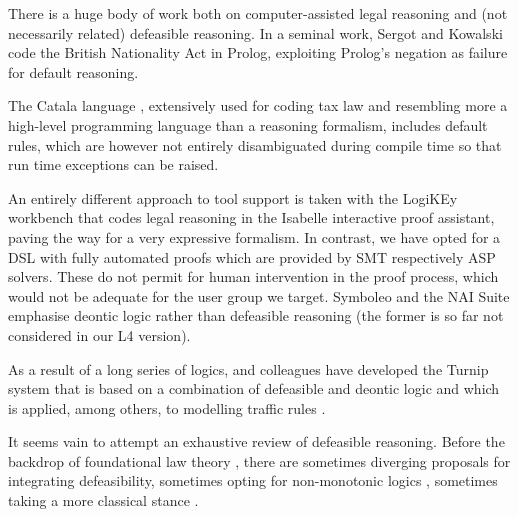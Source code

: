 There is a huge body of work both on computer-assisted legal reasoning and
(not necessarily related) defeasible reasoning. In a seminal work, Sergot and Kowalski
\citep{sergot_kowalski_etal__british_nationality_acm_1986,kowalski_legislation_logic_programs_1995}
code the British Nationality Act in Prolog, exploiting Prolog's negation as
failure for default reasoning.



The Catala language \citep{merigoux_chataing_protzenko_cata_icfp_2021},
extensively used for coding tax law and resembling more a high-level
programming language than a reasoning formalism, includes default rules, which
are however not entirely disambiguated during compile time so that run time
exceptions can be raised.

An entirely different approach to tool support is taken with the LogiKEy \citep{benzmueller_etal_logikey_2020}
workbench that codes legal reasoning in the Isabelle interactive proof assistant, paving
the way for a very expressive formalism. In contrast, we have opted for a DSL
with fully automated proofs which are provided by SMT respectively ASP solvers. These do not permit for human intervention in the proof process, which would not be adequate for the user group we target. Symboleo
\citep{sharifi_parvizimosaed_amyot_logrippo_mylopoulos_Symboleo_spec_legal_contracts_2020}
and the NAI Suite
\citep{libal_steen_nai_suite_draft_reason_legal_texts_jurix_2019} emphasise
deontic logic rather than defeasible reasoning (the former is so far not
considered in our L4 version).

As a result of a long series of logics,
\cite{governatori21:_unrav_legal_refer_defeas_deont_logic} 
and colleagues have developed the Turnip system
that is based on a
combination of defeasible and deontic logic and which is applied, among
others, to modelling traffic rules
\citep{governatori_Traffic_Rules_Encoding_using_Defeasible_jurix_2020}.

It seems vain to attempt an exhaustive
review of defeasible reasoning. Before the backdrop of foundational law
theory \citep{hart_concept_of_law_1997}, there are sometimes diverging
proposals for integrating defeasibility, sometimes opting for non-monotonic
logics \citep{hage_law_and_defeasibility_2003}, sometimes taking a more
classical stance \citep{alchourron_makinson_hierarchies_of_regulations_1981}. 

